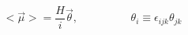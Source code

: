 \begin{equation}
<\overrightarrow{\mu}>=\frac{\textit{H}}{i}\overrightarrow{\theta},
\hspace{2cm}\theta_{i}\equiv\epsilon_{ijk}\theta_{jk}
\end{equation}

